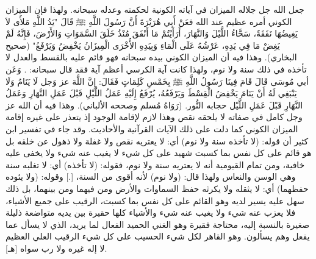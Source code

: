 جعل الله جل جلاله الميزان في آياته الكونية لحكمته وعدله سبحانه. ولهذا فإن الميزان الكوني أمره عظيم عند الله فعَنْ أَبِي هُرَيْرَةَ أَنَّ رَسُولَ اللَّهِ ﷺ قَالَ "يَدُ اللَّهِ مَلأَى لاَ يَغِيضُهَا نَفَقَةٌ، سَحَّاءُ اللَّيْلَ وَالنَّهَارَ، أَرَأَيْتُمْ مَا أَنْفَقَ مُنْذُ خَلَقَ السَّمَوَاتِ وَالأَرْضَ، فَإِنَّهُ لَمْ يَغِضْ مَا فِي يَدِهِ، عَرْشُهُ عَلَى الْمَاءِ وَبِيَدِهِ الأُخْرَى الْمِيزَانُ يَخْفِضُ وَيَرْفَعُ" {\footnotesize (صحيح البخاري)}. وهذا فيه أن الميزان الكوني بيده سبحانه فهو قائم عليه بالقسط والعدل لا تأخذه في ذلك سنة ولا نوم، ولهذا كانت آية الكرسي أعظم آية فقد قال سبحانه:
\quranayah*[2][255][1-12] {\footnotesize (\surahname*[2])}. وَعَن أبي مُوسَى قَالَ قَامَ فِينَا رَسُولُ اللَّهِ ﷺ بِخَمْسِ كَلِمَاتٍ فَقَالَ: إِنَّ اللَّهَ عز وَجل لَا يَنَامُ وَلَا يَنْبَغِي لَهُ أَنْ يَنَامَ يَخْفِضُ الْقِسْطَ وَيَرْفَعُهُ، يُرْفَعُ إِلَيْهِ عَمَلُ اللَّيْلِ قَبْلَ عَمَلِ النَّهَارِ وَعَمَلُ النَّهَارِ قَبْلَ عَمَلِ اللَّيْل حجابه النُّور. {\footnotesize (رَوَاهُ مُسلم وصححه الألباني)}. وهذا فيه أن الله عز وجل كامل في صفاته لا يلحقه نقص وهذا لازم لإقامة الوجود إذ يتعذر على غيره إقامة الميزان الكوني كما دلت على ذلك الآيات القرآنية والأحاديث. وقد جاء في تفسير ابن كثير أن قوله: (لا تأخذه سنة ولا نوم) أي: لا يعتريه نقص ولا غفلة ولا ذهول عن خلقه بل هو قائم على كل نفس بما كسبت شهيد على كل شيء لا يغيب عنه شيء ولا يخفى عليه خافية، ومن تمام القيومية أنه لا يعتريه سنة ولا نوم، فقوله: (لا تأخذه) أي: لا تغلبه سنة وهي الوسن والنعاس ولهذا قال: (ولا نوم) لأنه أقوى من السنة، [.] وقوله: (ولا يئوده حفظهما) أي: لا يثقله ولا يكرثه حفظ السماوات والأرض ومن فيهما ومن بينهما، بل ذلك سهل عليه يسير لديه وهو القائم على كل نفس بما كسبت، الرقيب على جميع الأشياء، فلا يعزب عنه شيء ولا يغيب عنه شيء والأشياء كلها حقيرة بين يديه متواضعة ذليلة صغيرة بالنسبة إليه، محتاجة فقيرة وهو الغني الحميد الفعال لما يريد، الذي لا يسأل عما يفعل وهم يسألون. وهو القاهر لكل شيء الحسيب على كل شيء الرقيب العلي العظيم لا إله غيره ولا رب سواه [هـ].

